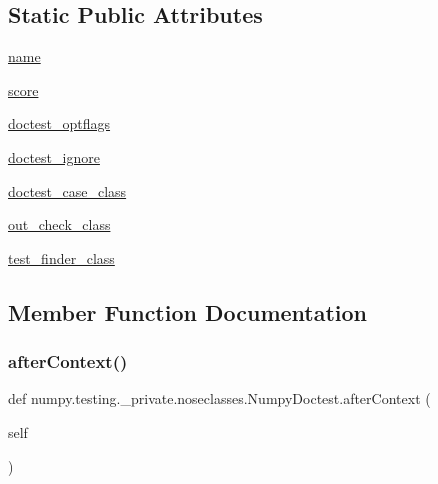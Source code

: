 \subsection*{Static Public Attributes}
\begin{DoxyCompactItemize}
\item 
\hyperlink{classnumpy_1_1testing_1_1__private_1_1noseclasses_1_1NumpyDoctest_a9467f1e2461f3ce57755c63f47637c04}{name}
\item 
\hyperlink{classnumpy_1_1testing_1_1__private_1_1noseclasses_1_1NumpyDoctest_a4a84c12eacaca5e9e904b31922b9733e}{score}
\item 
\hyperlink{classnumpy_1_1testing_1_1__private_1_1noseclasses_1_1NumpyDoctest_a005ab3311cc1ef88eade5b6f666bae57}{doctest\+\_\+optflags}
\item 
\hyperlink{classnumpy_1_1testing_1_1__private_1_1noseclasses_1_1NumpyDoctest_a2d971135bf307beb79122916e917ae66}{doctest\+\_\+ignore}
\item 
\hyperlink{classnumpy_1_1testing_1_1__private_1_1noseclasses_1_1NumpyDoctest_a00814fc550853da73b9d6c5856e7e24e}{doctest\+\_\+case\+\_\+class}
\item 
\hyperlink{classnumpy_1_1testing_1_1__private_1_1noseclasses_1_1NumpyDoctest_ab1141ae93e0049f271309cabfa0cdb73}{out\+\_\+check\+\_\+class}
\item 
\hyperlink{classnumpy_1_1testing_1_1__private_1_1noseclasses_1_1NumpyDoctest_aa597eaeb7dc07355b3a4ad5385ad205a}{test\+\_\+finder\+\_\+class}
\end{DoxyCompactItemize}


\subsection{Member Function Documentation}
\mbox{\label{classnumpy_1_1testing_1_1__private_1_1noseclasses_1_1NumpyDoctest_abbc6ccf49aa0f96ed6a1846f24e46169}} 
\subsubsection{\texorpdfstring{after\+Context()}{afterContext()}}
{\footnotesize\ttfamily def numpy.\+testing.\+\_\+private.\+noseclasses.\+Numpy\+Doctest.\+after\+Context (\begin{DoxyParamCaption}\item[{}]{self }\end{DoxyParamCaption})}

